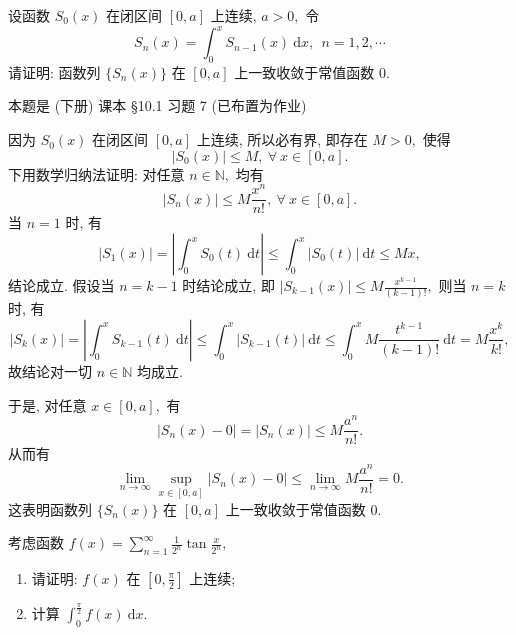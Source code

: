 \begin{question}[points = 10]
设函数 $S_0(x)$ 在闭区间 $[0, a]$ 上连续, $a > 0,$ 令
\[
S_n(x) = \int_0^x S_{n-1}(x) ~ \mathrm{d} x, ~~ n = 1, 2, \cdots
\]
请证明: 函数列 $\{ S_n(x) \}$ 在 $[0, a]$ 上一致收敛于常值函数 $0.$

\end{question}

\begin{solution}
本题是 (下册) 课本 \S 10.1 习题 7 (已布置为作业)

因为 $S_0(x)$ 在闭区间 $[0, a]$ 上连续, 所以必有界, 即存在 $M > 0,$ 使得
\begin{equation*}
|S_0(x)| \leqslant M, ~ \forall ~ x \in [0, a].
\end{equation*}
下用数学归纳法证明: 对任意 $n \in \mathbb{N},$ 均有
\begin{equation*}
|S_n(x)| \leqslant M \frac{x^n}{n!}, ~ \forall ~ x \in [0, a].
\end{equation*}
当 $n = 1$ 时, 有
\begin{equation*}
|S_1(x)| = \left| \int_0^x S_0(t) ~ \mathrm{d} t \right| \leqslant \int_0^x |S_0(t)| ~ \mathrm{d} t \leqslant Mx,
\end{equation*}
结论成立. 假设当 $n = k-1$ 时结论成立, 即 $|S_{k-1}(x)| \leqslant M \frac{x^{k-1}}{(k-1)!},$ 则当 $n = k$ 时, 有
\begin{equation*}
|S_k(x)| = \left| \int_0^x S_{k-1}(t) ~ \mathrm{d} t \right| \leqslant \int_0^x |S_{k-1}(t)| ~ \mathrm{d} t \leqslant \int_0^x M \frac{t^{k-1}}{(k-1)!} ~ \mathrm{d} t = M \frac{x^k}{k!},
\end{equation*}
故结论对一切 $n \in \mathbb{N}$ 均成立.

于是, 对任意 $x \in [0, a],$ 有
\begin{equation*}
|S_n(x) - 0| = |S_n(x)| \leqslant M \frac{a^n}{n!}.
\end{equation*}
从而有
\begin{equation*}
\lim_{n \to \infty} \sup_{x \in [0, a]} |S_n(x) - 0| \leqslant \lim_{n \to \infty} M \frac{a^n}{n!} = 0.
\end{equation*}
这表明函数列 $\{ S_n(x) \}$ 在 $[0, a]$ 上一致收敛于常值函数 $0.$
\end{solution}


\begin{question}[points = 12]
考虑函数 $\displaystyle f(x) = \sum_{n=1}^{\infty} \frac{1}{2^n} \tan \frac{x}{2^n},$
\begin{enumerate}
\item 请证明: $f(x)$ 在 $\left[ 0, \frac{\pi}{2} \right]$ 上连续;
\item 计算 $\displaystyle \int_{0}^{\frac{\pi}{2}} f(x) ~ \mathrm{d}x.$
\end{enumerate}

\end{question}

